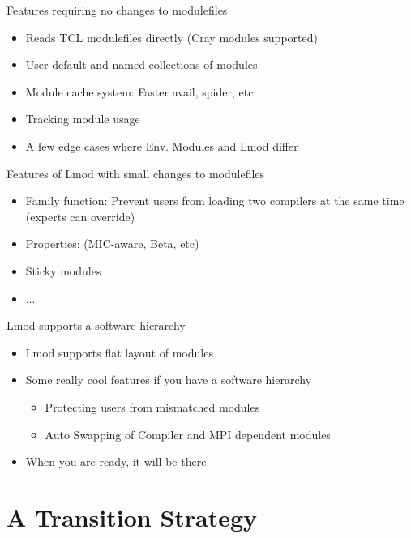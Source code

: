 \documentclass{beamer}
\begin{document}
\begin{frame}{Features requiring no changes to modulefiles}
  \begin{itemize}
    \item Reads TCL modulefiles directly (Cray modules supported)
    \item User default and named collections of modules
    \item Module cache system: Faster avail, spider, etc
    \item Tracking module usage 
    \item A few edge cases where Env. Modules and Lmod differ
  \end{itemize}
\end{frame}

\begin{frame}{Features of Lmod with small changes to modulefiles}
  \begin{itemize}
    \item Family function: Prevent users from loading two compilers at
      the same time (experts can override)
    \item Properties: (MIC-aware, Beta, etc)
    \item Sticky modules
    \item ...
  \end{itemize}
\end{frame}

\begin{frame}{Lmod supports a software hierarchy}
  \begin{itemize}
    \item Lmod supports flat layout of modules
    \item Some really cool features if you have a software hierarchy
      \begin{itemize}
        \item Protecting users from mismatched modules
        \item Auto Swapping of Compiler and MPI dependent modules
      \end{itemize}
    \item When you are ready, it will be there
  \end{itemize}
\end{frame}

\section{A Transition Strategy}
\end{document}
